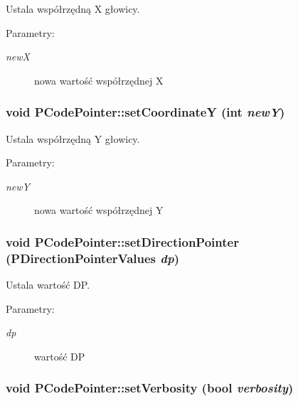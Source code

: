 Ustala współrzędną X głowicy. \begin{Desc}
\item[Parametry:]
\begin{description}
\item[{\em newX}]nowa wartość współrzędnej X \end{description}
\end{Desc}
\hypertarget{classPCodePointer_9fd77f14e39cc30f8cfc583ce97aa2f2}{
\subsubsection[{setCoordinateY}]{\setlength{\rightskip}{0pt plus 5cm}void PCodePointer::setCoordinateY (int {\em newY})}}
\label{classPCodePointer_9fd77f14e39cc30f8cfc583ce97aa2f2}


Ustala współrzędną Y głowicy. \begin{Desc}
\item[Parametry:]
\begin{description}
\item[{\em newY}]nowa wartość współrzędnej Y \end{description}
\end{Desc}
\hypertarget{classPCodePointer_0b97bd6b4383e976e54c5738178c7815}{
\subsubsection[{setDirectionPointer}]{\setlength{\rightskip}{0pt plus 5cm}void PCodePointer::setDirectionPointer ({\bf PDirectionPointerValues} {\em dp})}}
\label{classPCodePointer_0b97bd6b4383e976e54c5738178c7815}


Ustala wartość DP. \begin{Desc}
\item[Parametry:]
\begin{description}
\item[{\em dp}]wartość DP \end{description}
\end{Desc}
\hypertarget{classPCodePointer_d738019c8cb766c0863e2c00622d9fc9}{
\subsubsection[{setVerbosity}]{\setlength{\rightskip}{0pt plus 5cm}void PCodePointer::setVerbosity (bool {\em verbosity})}}
\label{classPCodePointer_d738019c8cb766c0863e2c00622d9fc9}


